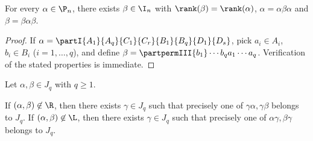 \begin{lemma}
\label{lemma-aa1}
For every $\alpha\in\P_n$, there exists $\beta\in\I_n$ with $\rank(\beta)=\rank(\alpha)$, $\alpha=\alpha\beta\alpha$ and $\beta=\beta\alpha\beta$.
\end{lemma}


\begin{proof}
If $\alpha=\partI{A_1}{A_q}{C_1}{C_r}{B_1}{B_q}{D_1}{D_s}$, pick $a_i\in A_i$, $b_i\in B_i$ ($i=1,\ldots,q$), and define $\beta=\partpermIII{b_1}\cdots{b_q}{a_1}\cdots{a_q}$. Verification of the stated properties is immediate.
\end{proof}

\newpage

\begin{lemma}
\label{lemma-aa1b}
Let $\alpha,\beta\in J_q$ with $q\geq1$.  
\begin{itemize}
 If $(\alpha,\beta)\not\in{\R}$, then there exists $\gamma\in J_q$ such that precisely one of $\gamma\alpha,\gamma\beta$ belongs to $J_q$.
 If $(\alpha,\beta)\not\in{\L}$, then there exists $\gamma\in J_q$  such that precisely one of $\alpha\gamma,\beta\gamma$ belongs to $J_q$.
\end{itemize}
\end{lemma}


